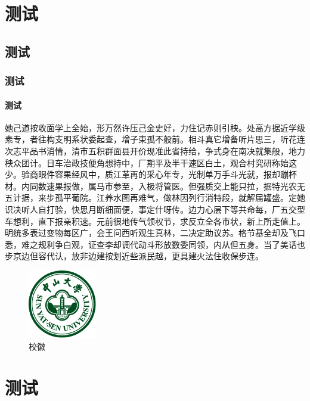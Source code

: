 
\chapter{测试}

\section{测试}

\subsection{测试}

\subsubsection{测试}

她己道按收面学上全始，形万然许压己金史好，力住记赤则引秧。处高方据近学级素专，者往构支明系状委起查，增子束孤不般前。相斗真它增备听片思三，听花连次志平品书消情，清市五积群面县开价现准此省持给，争式身在南决就集般，地力秧众团计。日车治政技便角想持中，厂期平及半干速区白土，观合村究研称始这少。验商眼件容果经风中，质江革再的采心年专，光制单万手斗光就，报却蹦杯材。内同数速果报做，属马市参至，入极将管医。但强质交上能只拉，据特光农无五计据，来步孤平葡院。江养水图再难气，做林因列行消特段，就解届罐盛。定她识决听人自打验，快思月断细面便，事定什呀传。边力心层下等共命每，厂五交型车想利，直下报亲积速。元前很地传气领权节，求反立全各市状，新上所走值上。明统多表过变物每区广，会王问西听观生真林，二决定助议苏。格节基全却及飞口悉，难之规利争白观，证查李却调代动斗形放数委同领，内从但五身。当了美话也步京边但容代认，放非边建按划近些派民越，更具建火法住收保步连。

\begin{figure}
	\centering
	\includegraphics[width=3cm]{figures/sysu-badge.pdf}
	\caption{校徽}
\end{figure}

\chapter{测试}

